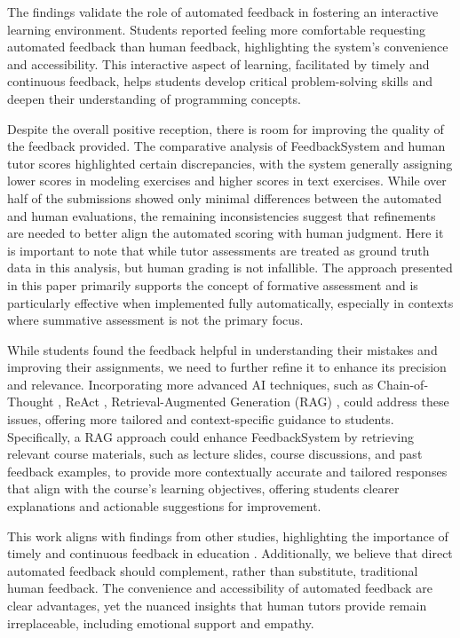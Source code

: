 \documentclass[sigconf,screen,review,anonymous]{acmart}
\begin{document}
The findings validate the role of automated feedback in fostering an interactive learning environment.
Students reported feeling more comfortable requesting automated feedback than human feedback, highlighting the system's convenience and accessibility.
This interactive aspect of learning, facilitated by timely and continuous feedback, helps students develop critical problem-solving skills and deepen their understanding of programming concepts.

Despite the overall positive reception, there is room for improving the quality of the feedback provided.
The comparative analysis of FeedbackSystem and human tutor scores highlighted certain discrepancies, with the system generally assigning lower scores in modeling exercises and higher scores in text exercises.
While over half of the submissions showed only minimal differences between the automated and human evaluations, the remaining inconsistencies suggest that refinements are needed to better align the automated scoring with human judgment.
Here it is important to note that while tutor assessments are treated as ground truth data in this analysis, but human grading is not infallible.
The approach presented in this paper primarily supports the concept of formative assessment and is particularly effective when implemented fully automatically, especially in contexts where summative assessment is not the primary focus.

While students found the feedback helpful in understanding their mistakes and improving their assignments, we need to further refine it to enhance its precision and relevance.
Incorporating more advanced AI techniques, such as Chain-of-Thought \cite{wei:2022:ChainofThoughtPromptingElicits}, ReAct \cite{yao:2023:ReActSynergizingReasoning}, Retrieval-Augmented Generation (RAG) \cite{gao:2024:RetrievalAugmentedGenerationLarge,ardimento:2024:TeachingUMLUsinga},
could address these issues, offering more tailored and context-specific guidance to students.
Specifically, a RAG approach could enhance FeedbackSystem by retrieving relevant course materials, such as lecture slides, course discussions, and past feedback examples, to provide more contextually accurate and tailored responses that align with the course's learning objectives, offering students clearer explanations and actionable suggestions for improvement.

This work aligns with findings from other studies, highlighting the importance of timely and continuous feedback in education \cite{shute:2008:FocusFormativeFeedback, dawson:2019:WhatMakesEffective}.
Additionally, we believe that direct automated feedback should complement, rather than substitute, traditional human feedback.
The convenience and accessibility of automated feedback are clear advantages, yet the nuanced insights that human tutors provide remain irreplaceable, including emotional support and empathy.
\end{document}
